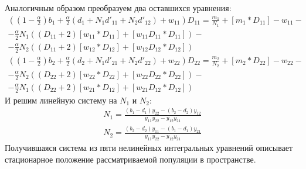 Аналогичным образом преобразуем два оставшихся уравнения:
\begin{align*}
((1-\frac{\alpha}{2})b_{1}+\frac{\alpha}{2}(d_{1}+N_{1}d'_{11}+N_{2}d'_{12})+w_{11})D_{11}=\frac{m_{1}}{N_{1}}+\left[m_{1}*D_{11}\right]-w_{11}-\\
-\frac{\alpha}{2}N_{1}((D_{11}+2)[w_{11}*D_{11}]+[w_{11}D_{11}*D_{11}])-\\
-\frac{\alpha}{2}N_{2}((D_{11}+2)[w_{12}*D_{12}]+[w_{12}D_{12}*D_{12}])
\\
((1-\frac{\alpha}{2})b_{2}+\frac{\alpha}{2}(d_{2}+N_{1}d'_{21}+N_{2}d'_{22})+w_{22})D_{22}=\frac{m_{2}}{N_{2}}+\left[m_{2}*D_{22}\right]-w_{22}-\\
-\frac{\alpha}{2}N_{2}((D_{22}+2)[w_{22}*D_{22}]+[w_{22}D_{22}*D_{22}])-\\
-\frac{\alpha}{2}N_{1}((D_{22}+2)[w_{21}*D_{12}]+[w_{21}D_{12}*D_{12}])
\end{align*}
И решим линейную систему на $ N_{1} $ и $ N_{2} $:
\begin{align*}
N_{1}=\frac{(b_{1}-d_{1})y_{22}-(b_{2}-d_{2})y_{12}}{y_{11}y_{22}-y_{12}y_{21}}
\\
N_{2}=\frac{(b_{2}-d_{2})y_{11}-(b_{1}-d_{1})y_{21}}{y_{11}y_{22}-y_{12}y_{21}}
\end{align*}
Получившаяся система из пяти нелинейных интегральных уравнений описывает стационарное положение рассматриваемой популяции в пространстве.